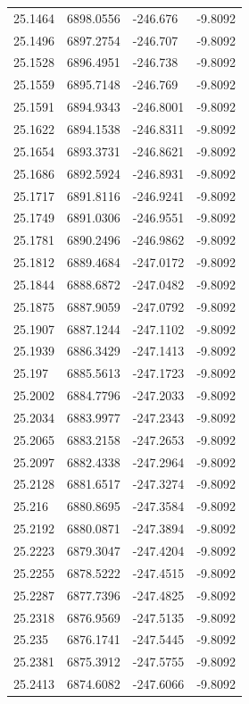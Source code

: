 \begin{table}[H]
\begin{tabular}{llll}
25.1464 & 6898.0556 & -246.676 & -9.8092 \\
25.1496 & 6897.2754 & -246.707 & -9.8092 \\
25.1528 & 6896.4951 & -246.738 & -9.8092 \\
25.1559 & 6895.7148 & -246.769 & -9.8092 \\
25.1591 & 6894.9343 & -246.8001 & -9.8092 \\
25.1622 & 6894.1538 & -246.8311 & -9.8092 \\
25.1654 & 6893.3731 & -246.8621 & -9.8092 \\
25.1686 & 6892.5924 & -246.8931 & -9.8092 \\
25.1717 & 6891.8116 & -246.9241 & -9.8092 \\
25.1749 & 6891.0306 & -246.9551 & -9.8092 \\
25.1781 & 6890.2496 & -246.9862 & -9.8092 \\
25.1812 & 6889.4684 & -247.0172 & -9.8092 \\
25.1844 & 6888.6872 & -247.0482 & -9.8092 \\
25.1875 & 6887.9059 & -247.0792 & -9.8092 \\
25.1907 & 6887.1244 & -247.1102 & -9.8092 \\
25.1939 & 6886.3429 & -247.1413 & -9.8092 \\
25.197 & 6885.5613 & -247.1723 & -9.8092 \\
25.2002 & 6884.7796 & -247.2033 & -9.8092 \\
25.2034 & 6883.9977 & -247.2343 & -9.8092 \\
25.2065 & 6883.2158 & -247.2653 & -9.8092 \\
25.2097 & 6882.4338 & -247.2964 & -9.8092 \\
25.2128 & 6881.6517 & -247.3274 & -9.8092 \\
25.216 & 6880.8695 & -247.3584 & -9.8092 \\
25.2192 & 6880.0871 & -247.3894 & -9.8092 \\
25.2223 & 6879.3047 & -247.4204 & -9.8092 \\
25.2255 & 6878.5222 & -247.4515 & -9.8092 \\
25.2287 & 6877.7396 & -247.4825 & -9.8092 \\
25.2318 & 6876.9569 & -247.5135 & -9.8092 \\
25.235 & 6876.1741 & -247.5445 & -9.8092 \\
25.2381 & 6875.3912 & -247.5755 & -9.8092 \\
25.2413 & 6874.6082 & -247.6066 & -9.8092 \\

\end{tabular}
\end{table}
